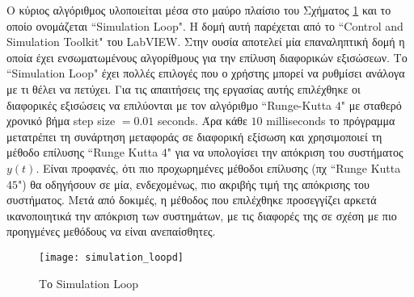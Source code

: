 Ο κύριος αλγόριθμος υλοποιείται μέσα στο μαύρο πλαίσιο του Σχήματος \ref{fig:simulation_loopd} και το οποίο ονομάζεται ``Simulation Loop". Η δομή αυτή παρέχεται από το ``Control and Simulation Toolkit" του LabVIEW. Στην ουσία αποτελεί μία επαναληπτική δομή η οποία έχει ενσωματωμένους αλγορίθμους για την επίλυση διαφορικών εξισώσεων. Το ``Simulation Loop" έχει πολλές επιλογές που ο χρήστης μπορεί να ρυθμίσει ανάλογα με τι θέλει να πετύχει. Για τις απαιτήσεις της εργασίας αυτής επιλέχθηκε οι διαφορικές εξισώσεις να επιλύονται με τον αλγόριθμο ``Runge-Kutta $4$" με σταθερό χρονικό βήμα step size $= 0.01$ seconds. Άρα κάθε $10$ milliseconds το πρόγραμμα μετατρέπει τη συνάρτηση μεταφοράς σε διαφορική εξίσωση και χρησιμοποιεί τη μέθοδο επίλυσης ``Runge Kutta $4$" για να υπολογίσει την απόκριση του συστήματος $y(t)$. Είναι προφανές, ότι πιο προχωρημένες μέθοδοι επίλυσης (πχ ``Runge Kutta $45$") θα οδηγήσουν σε μία, ενδεχομένως, πιο ακριβής τιμή της απόκρισης του συστήματος. Μετά από δοκιμές, η μέθοδος που επιλέχθηκε προσεγγίζει αρκετά ικανοποιητικά την απόκριση των συστημάτων, με τις διαφορές της σε σχέση με πιο προηγμένες μεθόδους να είναι ανεπαίσθητες. 


\begin{figure}[!htb]
  \centering
  \texttt{[image: simulation\_loopd]}
  \caption{Το Simulation Loop}
  \label{fig:simulation_loopd}
\end{figure}














